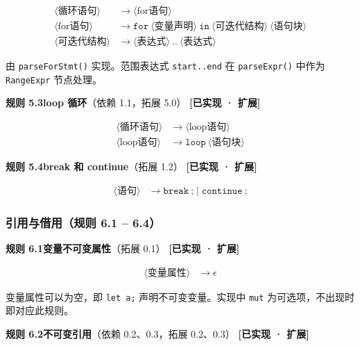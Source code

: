 \documentclass[12pt,a4paper]{ctexart}
\begin{document}
\begin{align}
\langle\text{循环语句}\rangle &\rightarrow \langle\text{for语句}\rangle \\
\langle\text{for语句}\rangle &\rightarrow \texttt{for} \ \langle\text{变量声明}\rangle \ \texttt{in} \ \langle\text{可迭代结构}\rangle \ \langle\text{语句块}\rangle \\
\langle\text{可迭代结构}\rangle &\rightarrow \langle\text{表达式}\rangle \ \texttt{..} \ \langle\text{表达式}\rangle
\end{align}

由 \texttt{parseForStmt()} 实现。范围表达式 \texttt{start..end} 在 \texttt{parseExpr()} 中作为 \texttt{RangeExpr} 节点处理。

\textbf{规则 5.3\quad loop 循环}（依赖 1.1，拓展 5.0） \hfill \textcolor{green!60!black}{\textbf{[已实现 · 扩展]}}

\begin{align}
\langle\text{循环语句}\rangle &\rightarrow \langle\text{loop语句}\rangle \\
\langle\text{loop语句}\rangle &\rightarrow \texttt{loop} \ \langle\text{语句块}\rangle
\end{align}

\textbf{规则 5.4\quad break 和 continue}（拓展 1.2） \hfill \textcolor{green!60!black}{\textbf{[已实现 · 扩展]}}

\begin{align}
\langle\text{语句}\rangle &\rightarrow \texttt{break} \ \texttt{;} \mid \texttt{continue} \ \texttt{;}
\end{align}

\subsubsection{引用与借用（规则 6.1 -- 6.4）}

\textbf{规则 6.1\quad 变量不可变属性}（拓展 0.1） \hfill \textcolor{green!60!black}{\textbf{[已实现 · 扩展]}}

\begin{align}
\langle\text{变量属性}\rangle &\rightarrow \epsilon
\end{align}

变量属性可以为空，即 \texttt{let a;} 声明不可变变量。实现中 \texttt{mut} 为可选项，不出现时即对应此规则。

\textbf{规则 6.2\quad 不可变引用}（依赖 0.2、0.3，拓展 0.2、0.3） \hfill \textcolor{green!60!black}{\textbf{[已实现 · 扩展]}}
\end{document}
